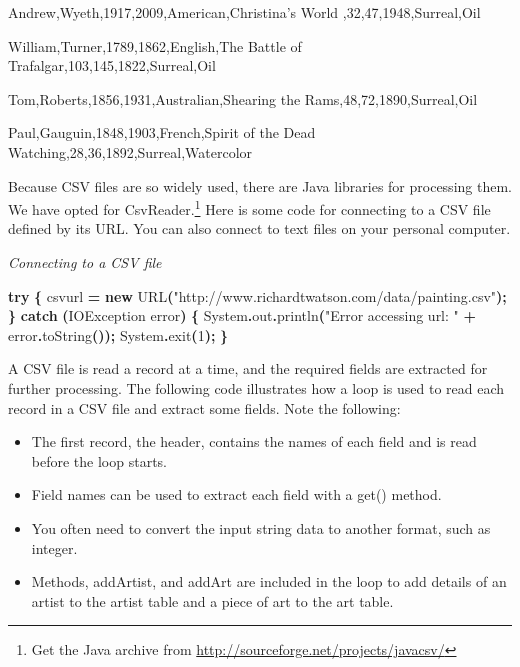 \documentclass[
]{article}
\newenvironment{Shaded}{\begin{snugshade}}{\end{snugshade}}
\newcommand{\BuiltInTok}[1]{#1}
\newcommand{\ControlFlowTok}[1]{\textcolor[rgb]{0.13,0.29,0.53}{\textbf{#1}}}
\newcommand{\DecValTok}[1]{\textcolor[rgb]{0.00,0.00,0.81}{#1}}
\newcommand{\FunctionTok}[1]{\textcolor[rgb]{0.00,0.00,0.00}{#1}}
\newcommand{\KeywordTok}[1]{\textcolor[rgb]{0.13,0.29,0.53}{\textbf{#1}}}
\newcommand{\NormalTok}[1]{#1}
\newcommand{\OperatorTok}[1]{\textcolor[rgb]{0.81,0.36,0.00}{\textbf{#1}}}
\newcommand{\StringTok}[1]{\textcolor[rgb]{0.31,0.60,0.02}{#1}}
\begin{document}
Andrew,Wyeth,1917,2009,American,Christina's World
,32,47,1948,Surreal,Oil

William,Turner,1789,1862,English,The Battle of
Trafalgar,103,145,1822,Surreal,Oil

Tom,Roberts,1856,1931,Australian,Shearing the
Rams,48,72,1890,Surreal,Oil

Paul,Gauguin,1848,1903,French,Spirit of the Dead
Watching,28,36,1892,Surreal,Watercolor

Because CSV files are so widely used, there are Java libraries for
processing them. We have opted for CsvReader.\footnote{Get the Java archive from
  \url{http://sourceforge.net/projects/javacsv/}} Here is some code for
connecting to a CSV file defined by its URL. You can also connect to
text files on your personal computer.

\emph{Connecting to a CSV file}

\begin{Shaded}
\begin{Highlighting}[]
\ControlFlowTok{try} \OperatorTok{\{}
\NormalTok{    csvurl }\OperatorTok{=} \KeywordTok{new} \BuiltInTok{URL}\OperatorTok{(}\StringTok{"http://www.richardtwatson.com/data/painting.csv"}\OperatorTok{);} 
\OperatorTok{\}} \ControlFlowTok{catch} \OperatorTok{(}\BuiltInTok{IOException}\NormalTok{ error}\OperatorTok{)} \OperatorTok{\{}
    \BuiltInTok{System}\OperatorTok{.}\FunctionTok{out}\OperatorTok{.}\FunctionTok{println}\OperatorTok{(}\StringTok{"Error accessing url: "} \OperatorTok{+}\NormalTok{ error}\OperatorTok{.}\FunctionTok{toString}\OperatorTok{());}
    \BuiltInTok{System}\OperatorTok{.}\FunctionTok{exit}\OperatorTok{(}\DecValTok{1}\OperatorTok{);}
\OperatorTok{\}} 
\end{Highlighting}
\end{Shaded}

A CSV file is read a record at a time, and the required fields are
extracted for further processing. The following code illustrates how a
loop is used to read each record in a CSV file and extract some fields.
Note the following:

\begin{itemize}
\item
  The first record, the header, contains the names of each field and
  is read before the loop starts.
\item
  Field names can be used to extract each field with a get() method.
\item
  You often need to convert the input string data to another format,
  such as integer.
\item
  Methods, addArtist, and addArt are included in the loop to add
  details of an artist to the artist table and a piece of art to the
  art table.
\end{itemize}
\end{document}

